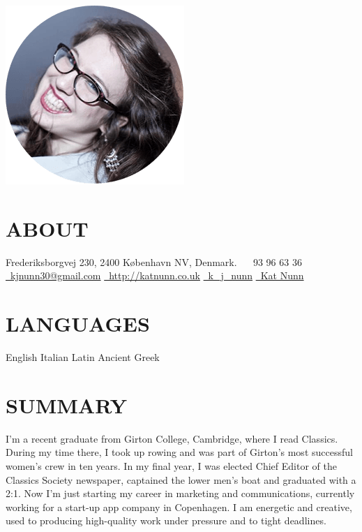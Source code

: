 \documentclass[]{friggeri-cv}
\begin{document}
       {}

\begin{aside}
  \includegraphics[width=.66\textwidth]{../img/profile.png}
  \section{ABOUT}
    Frederiksborgvej 230,
    2400 København NV,
    Denmark.
    ~
	\onehalfspacing
	\faPhone~93 96 63 36
	\href{mailto:kjnunn30@gmail.com}{\faEnvelope~kjnunn30@gmail.com}
	\href{http://katnunn.co.uk}{\faGlobe~http://katnunn.co.uk}
	\href{https://twitter.com/k\_j\_nunn}{\faTwitter~k\_j\_nunn}
	\href{http://uk.linkedin.com/in/katnunn/}{\faLinkedin~Kat Nunn}
	\singlespacing
  \section{LANGUAGES}
    English
    Italian
    Latin
    Ancient Greek
\end{aside}

\section{SUMMARY}
I'm a recent graduate from Girton College, Cambridge, where I read Classics. During my time there, I took up rowing and was part of Girton's most successful women's crew in ten years. In my final year, I was elected Chief Editor of the Classics Society newspaper, captained the lower men's boat and graduated with a 2:1. Now I'm just starting my career in marketing and communications, currently working for a start-up app company in Copenhagen. I am energetic and creative, used to producing high-quality work under pressure and to tight deadlines.
\end{document}
